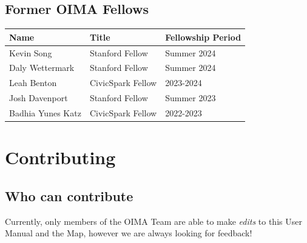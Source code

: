 \documentclass[
  letterpaper,
  DIV=11,
  numbers=noendperiod]{scrreprt}
\begin{document}
\section{Former OIMA Fellows}\label{former-oima-fellows}

\begin{longtable}[]{@{}lll@{}}
\toprule\noalign{}
Name & Title & Fellowship Period \\
\midrule\noalign{}
\endhead
\bottomrule\noalign{}
\endlastfoot
Kevin Song & Stanford Fellow & Summer 2024 \\
Daly Wettermark & Stanford Fellow & Summer 2024 \\
Leah Benton & CivicSpark Fellow & 2023-2024 \\
Josh Davenport & Stanford Fellow & Summer 2023 \\
Badhia Yunes Katz & CivicSpark Fellow & 2022-2023 \\
\end{longtable}


\chapter{Contributing}\label{contributing}

\section{Who can contribute}\label{who-can-contribute}

Currently, only members of the OIMA Team are able to make \emph{edits}
to this User Manual and the Map, however we are always looking for
feedback!
\end{document}
